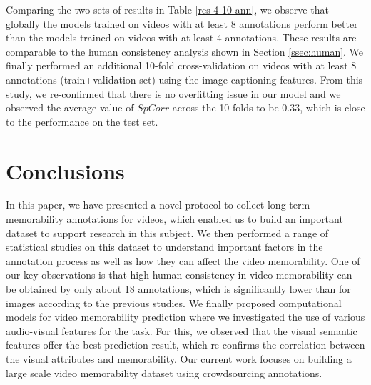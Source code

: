 \documentclass[sigconf]{acmart}
\begin{document}
Comparing the two sets of results in Table \ref{res-4-10-ann}, we observe that globally the models trained on videos with at least 8 annotations perform better than the models trained on videos with at least 4 annotations.
These results are comparable to the human consistency analysis shown in Section \ref{ssec:human}.
We finally performed an additional 10-fold cross-validation on videos with at least 8 annotations (train+validation set) using the image captioning features. From this study, we re-confirmed that there is no overfitting issue in our model and we observed the average value of $SpCorr$ across the 10 folds to be 0.33, which is close to the performance on the test set.

\section{Conclusions}
\label{conclusions}
In this paper, we have presented a novel protocol to collect long-term memorability annotations for videos, which enabled us to build an important dataset to support research in this subject. We then performed a range of statistical studies on this dataset to understand important factors in the annotation process as well as how they can affect the video memorability. One of our key observations is that high human consistency in video memorability can be obtained by only about 18 annotations, which is significantly lower than for images according to the previous studies. We finally proposed computational models for video memorability prediction where we investigated the use of various audio-visual features for the task. For this, we observed that the visual semantic features offer the best prediction result, which re-confirms the correlation between the visual attributes and memorability. Our current work focuses on building a large scale video memorability dataset using crowdsourcing annotations.  
\end{document}
